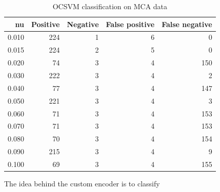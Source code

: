 \documentclass[a4paper,twoside,12pt]{book}
\begin{document}
\begin{table}
	\centering
	\caption{OCSVM classification on MCA data}
	\label{id:tab:OCSVMonMCA}
\begin{tabular}{rrrrr}
	\toprule
		nu &  Positive &  Negative &  False positive &  False negative \\
	\midrule
	 0.010 &       224 &         1 &               6 &               0 \\
	 0.015 &       224 &         2 &               5 &               0 \\
	 0.020 &        74 &         3 &               4 &             150 \\
	 0.030 &       222 &         3 &               4 &               2 \\
	 0.040 &        77 &         3 &               4 &             147 \\
	 0.050 &       221 &         3 &               4 &               3 \\
	 0.060 &        71 &         3 &               4 &             153 \\
	 0.070 &        71 &         3 &               4 &             153 \\
	 0.080 &        70 &         3 &               4 &             154 \\
	 0.090 &       215 &         3 &               4 &               9 \\
	 0.100 &        69 &         3 &               4 &             155 \\
	\bottomrule
\end{tabular}
\end{table} 

The idea behind the custom encoder is to classify 

\end{document}
